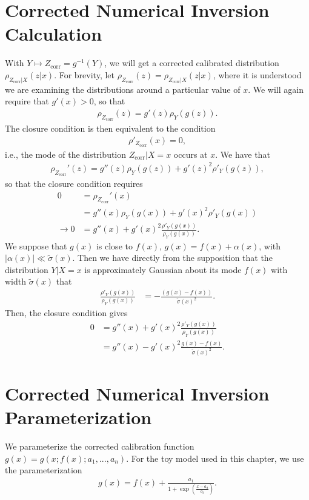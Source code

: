 \section{Corrected Numerical Inversion Calculation}
\label{sec:corrected_numerical_inversion_calculation}
With $Y\mapsto Z_\text{corr} = g^{-1}(Y)$, we will get a corrected calibrated distribution $\rho_{Z_\text{corr}|X}(z|x)$. For brevity, let $\rho_{Z_\text{corr}}(z)=\rho_{Z_\text{corr}|X}(z|x)$, where it is understood we are examining the distributions around a particular value of $x$. We will again require that $g'(x)>0$, so that
\begin{align}
\rho_{Z_\text{corr}}(z) = g'(z)\rho_Y(g(z)).
\end{align}
The closure condition is then equivalent to the condition
\begin{align}
\rho'_{Z_\text{corr}}(x) = 0,
\end{align}
i.e., the mode of the distribution $Z_\text{corr}|X=x$ occurs at $x$.  We have that
\begin{align}
\rho_{Z_\text{corr}}'(z) = g''(z)\rho_Y(g(z))+g'(z)^2\rho'_Y(g(z)),
\end{align}
so that the closure condition requires
\begin{align}
0 &=\rho_{Z_\text{corr}}'(x)\nonumber\\
&=g''(x)\rho_Y(g(x))+g'(x)^2\rho'_Y(g(x))\nonumber\\
\rightarrow 0 &=g''(x)+g'(x)^2\frac{\rho'_Y(g(x))}{\rho_Y(g(x))}.
\end{align}
We suppose that $g(x)$ is close to $f(x)$, $g(x)=f(x)+\alpha(x)$, with $|\alpha(x)|\ll \tilde{\sigma}(x)$. Then we have directly from the supposition that the distribution $Y|X=x$ is approximately Gaussian about its mode $f(x)$ with width $\tilde{\sigma}(x)$ that
\begin{align}
\frac{\rho'_Y(g(x))}{\rho_Y(g(x))} &= -\frac{\left(g(x)-f(x)\right)}{\tilde{\sigma}(x)^2}.
\end{align}
Then, the closure condition gives
\begin{align}
0 &=g''(x)+g'(x)^2\frac{\rho'_Y(g(x))}{\rho_Y(g(x))}\nonumber\\
&=g''(x)-g'(x)^2\frac{g(x)-f(x)}{\tilde{\sigma}(x)^2}.
\end{align}

\section{Corrected Numerical Inversion Parameterization}
\label{sec:corrected_numerical_inversion_parameterization}
We parameterize the corrected calibration function $g(x) = g(x;f(x);a_1,...,a_n)$. For the toy model used in this chapter, we use the parameterization
\begin{align}
g(x) = f(x)+\frac{a_1}{1+\exp(\frac{x-a_2}{a_3})}.
\label{eqn:app_parameterization}
\end{align}

